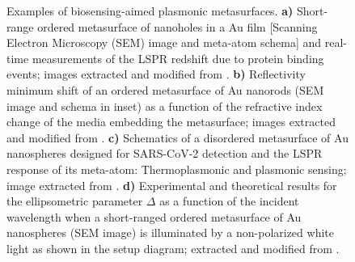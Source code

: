 \begin{figure}[h!]
\centering
\hspace*{-3.75em}%
  \vspace*{-.75em}
  \caption[Backgrounds]{Examples of biosensing-aimed plasmonic metasurfaces. \textbf{a)} Short-range ordered metasurface of nanoholes in a Au film [Scanning Electron Microscopy (SEM) image and meta-atom schema] and real-time measurements of the LSPR redshift due to protein binding events; images extracted and modified from \cite{feuz_improving_2010}. \textbf{b) } Reflectivity minimum shift of an ordered metasurface of Au nanorods (SEM image and schema in inset) as a function of the refractive index change of the media embedding the metasurface; images extracted and modified from \cite{kabashin_plasmonic_2009}. \textbf{c)} Schematics of a disordered metasurface of Au nanospheres designed for SARS-CoV-2 detection and the LSPR response of its meta-atom: Thermoplasmonic and plasmonic sensing; image extracted from \cite{qiu_dual_2020}. \textbf{d)} Experimental and theoretical results for the ellipsometric parameter $\Delta$ as a function of the incident wavelength when a short-ranged ordered metasurface of Au nanospheres (SEM image) is illuminated by a  non-polarized white light as shown in the setup diagram; extracted and modified from \cite{svedendahl_refractometric_2014}.
  }
\label{fig:IncPapers}
\end{figure}
%
